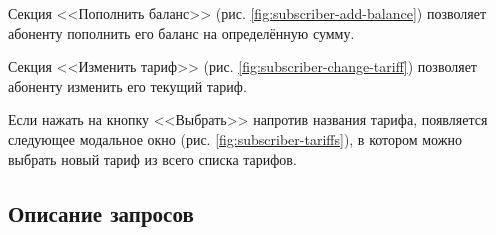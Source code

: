 Секция <<Пополнить баланс>> (рис. \ref{fig:subscriber-add-balance}) позволяет абоненту пополнить его баланс на определённую сумму.

Секция <<Изменить тариф>> (рис. \ref{fig:subscriber-change-tariff}) позволяет абоненту изменить его текущий тариф.

Если нажать на кнопку <<Выбрать>> напротив названия тарифа, появляется следующее модальное окно (рис. \ref{fig:subscriber-tariffs}), в котором можно выбрать новый тариф из всего списка тарифов.


\subsection{Описание запросов}



